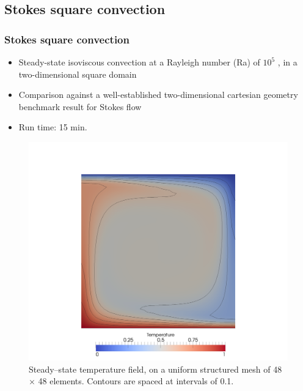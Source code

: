 \subsection{Stokes square convection}

\begin{frame}
  \frametitle{Stokes square convection}
  \begin{minipage}[]{0.45\linewidth}
    \begin{itemize}
    \item Steady-state isoviscous convection at a Rayleigh number (Ra) of $10^5$ , in a two-dimensional square domain
    \item Comparison against a well-established two-dimensional cartesian geometry benchmark result for Stokes flow
    \item Run time: 15 min.
    \end{itemize}
  \end{minipage}
  \begin{minipage}[]{0.45\linewidth}
    \begin{figure}
      \includegraphics[width=\textwidth]{./stokes_square_convection/Temperature_planform.png}
      \caption{Steady–state temperature field, on a uniform structured mesh of 48 $\times$ 48 elements. Contours are
        spaced at intervals of 0.1.}
    \end{figure}
  \end{minipage}
\end{frame}
